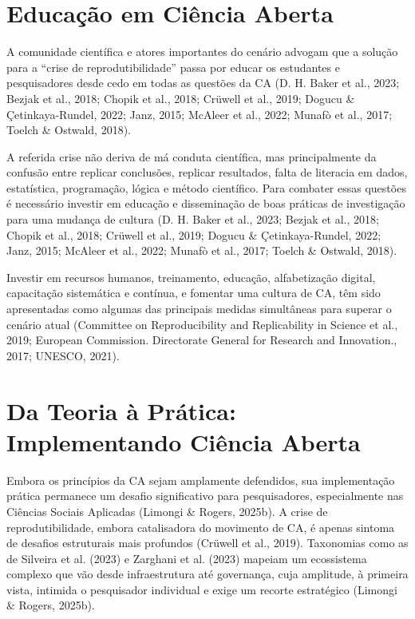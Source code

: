 \documentclass[
  a4paper,
]{book}
\begin{document}
\section{Educação em Ciência
Aberta}\label{educauxe7uxe3o-em-ciuxeancia-aberta}

A comunidade científica e atores importantes do cenário advogam que a
solução para a ``crise de reprodutibilidade'' passa por educar os
estudantes e pesquisadores desde cedo em todas as questões da CA (D. H.
Baker et al., 2023; Bezjak et al., 2018; Chopik et al., 2018; Crüwell et
al., 2019; Dogucu \& Çetinkaya-Rundel, 2022; Janz, 2015; McAleer et al.,
2022; Munafò et al., 2017; Toelch \& Ostwald, 2018).

A referida crise não deriva de má conduta científica, mas principalmente
da confusão entre replicar conclusões, replicar resultados, falta de
literacia em dados, estatística, programação, lógica e método
científico. Para combater essas questões é necessário investir em
educação e disseminação de boas práticas de investigação para uma
mudança de cultura (D. H. Baker et al., 2023; Bezjak et al., 2018;
Chopik et al., 2018; Crüwell et al., 2019; Dogucu \& Çetinkaya-Rundel,
2022; Janz, 2015; McAleer et al., 2022; Munafò et al., 2017; Toelch \&
Ostwald, 2018).

Investir em recursos humanos, treinamento, educação, alfabetização
digital, capacitação sistemática e contínua, e fomentar uma cultura de
CA, têm sido apresentadas como algumas das principais medidas
simultâneas para superar o cenário atual (Committee on Reproducibility
and Replicability in Science et al., 2019; European Commission.
Directorate General for Research and Innovation., 2017; UNESCO, 2021).

\section{Da Teoria à Prática: Implementando Ciência
Aberta}\label{da-teoria-uxe0-pruxe1tica-implementando-ciuxeancia-aberta}

Embora os princípios da CA sejam amplamente defendidos, sua
implementação prática permanece um desafio significativo para
pesquisadores, especialmente nas Ciências Sociais Aplicadas (Limongi \&
Rogers, 2025b). A crise de reprodutibilidade, embora catalisadora do
movimento de CA, é apenas sintoma de desafios estruturais mais profundos
(Crüwell et al., 2019). Taxonomias como as de Silveira et al. (2023) e
Zarghani et al. (2023) mapeiam um ecossistema complexo que vão desde
infraestrutura até governança, cuja amplitude, à primeira vista,
intimida o pesquisador individual e exige um recorte estratégico
(Limongi \& Rogers, 2025b).
\end{document}
